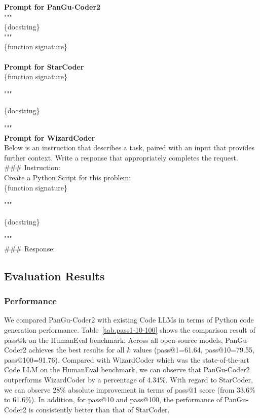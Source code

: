 \documentclass{article}
\newcommand{\pgcoder}{PanGu-Coder2\xspace}
\begin{document}
\begin{tcolorbox}[left=2pt,right=2pt,top=0pt,bottom=0pt]
\textbf{Prompt for \pgcoder}\\
"""\\
\{docstring\}\\
"""\\
\{function signature\}\\
\\
\textbf{Prompt for StarCoder}\\
\{function signature\}

\hspace{1.5em}"""

\hspace{1.5em}\{docstring\}

\hspace{1.5em}"""\\

\textbf{Prompt for WizardCoder}\\
Below is an instruction that describes a task, paired with an input that provides further context. Write a response that appropriately completes the request. \\
\#\#\# Instruction:\\
Create a Python Script for this problem:\\
\{function signature\}

\hspace{1.5em}"""

\hspace{1.5em}\{docstring\}

\hspace{1.5em}"""\\

\#\#\# Response:
\end{tcolorbox}


\subsection{Evaluation Results}

\subsubsection{Performance}
We compared \pgcoder with existing Code LLMs in terms of Python code generation performance. 
Table~\ref{tab.pass1-10-100} shows the comparison result of pass@k on the HumanEval benchmark. Across all open-source models, \pgcoder achieves the best results for all $k$ values (pass@1=61.64, pass@10=79.55, pass@100=91.76). Compared with WizardCoder which was the state-of-the-art Code LLM on the HumanEval benchmark, we can observe that \pgcoder outperforms WizardCoder by a percentage of 4.34\%. 
With regard to StarCoder, we can observe 28\% absolute improvement in terms of pass@1 score (from 33.6\% to 61.6\%). In addition, for pass@10 and pass@100, the performance of \pgcoder is consistently better than that of StarCoder. 
\end{document}
